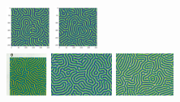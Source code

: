 \begin{itemize}
\includegraphics[height=1.4cm]{python_codes/fieldstone_171/pearson93_rand/theta_solution_0050000_u}
\includegraphics[height=1.4cm]{python_codes/fieldstone_171/pearson93_rand/theta_solution_final_u}\\
\includegraphics[height=1.4cm]{python_codes/fieldstone_171/images/pear93_theta}
\includegraphics[height=1.4cm]{python_codes/fieldstone_171/images/munafo_theta1}
\includegraphics[height=1.4cm]{python_codes/fieldstone_171/images/munafo_theta2}





\end{itemize}
